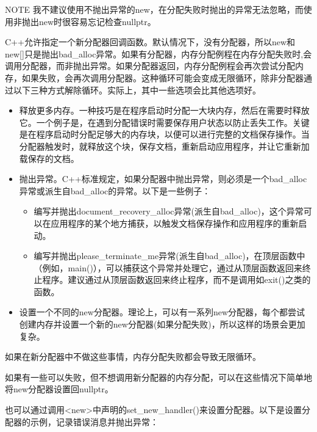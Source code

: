 \begin{myNotic}{NOTE}
我不建议使用不抛出异常的new，在分配失败时抛出的异常无法忽略，而使用非抛出new时很容易忘记检查nullptr。
\end{myNotic}


C++允许指定一个新分配器回调函数。默认情况下，没有分配器，所以new和new[]只是抛出bad\_alloc异常。如果有分配器，内存分配例程在内存分配失败时,会调用分配器，而非抛出异常。如果分配器返回，内存分配例程会再次尝试分配内存，如果失败，会再次调用分配器。这种循环可能会变成无限循环，除非分配器通过以下三种方式解除循环。实际上，其中一些选项会比其他选项好。

\begin{itemize}
\item
释放更多内存。一种技巧是在程序启动时分配一大块内存，然后在需要时释放它。一个例子是，在遇到分配错误时需要保存用户状态以防止丢失工作。关键是在程序启动时分配足够大的内存块，以便可以进行完整的文档保存操作。当分配器触发时，就释放这个块，保存文档，重新启动应用程序，并让它重新加载保存的文档。

\item
抛出异常。C++标准规定，如果分配器中抛出异常，则必须是一个bad\_alloc异常或派生自bad\_alloc的异常。以下是一些例子：
\begin{itemize}
\item
编写并抛出document\_recovery\_alloc异常(派生自bad\_alloc)，这个异常可以在应用程序的某个地方捕获，以触发文档保存操作和应用程序的重新启动。

\item
编写并抛出please\_terminate\_me异常(派生自bad\_alloc)，在顶层函数中（例如，main()），可以捕获这个异常并处理它，通过从顶层函数返回来终止程序。建议通过从顶层函数返回来终止程序，而不是调用如exit()之类的函数。
\end{itemize}

\item
设置一个不同的new分配器。理论上，可以有一系列new分配器，每个都尝试创建内存并设置一个新的new分配器(如果分配失败)，所以这样的场景会更加复杂。
\end{itemize}

如果在新分配器中不做这些事情，内存分配失败都会导致无限循环。

如果有一些可以失败，但不想调用新分配器的内存分配，可以在这些情况下简单地将new分配器设置回nullptr。

也可以通过调用<new>中声明的set\_new\_handler()来设置分配器。以下是设置分配器的示例，记录错误消息并抛出异常：

